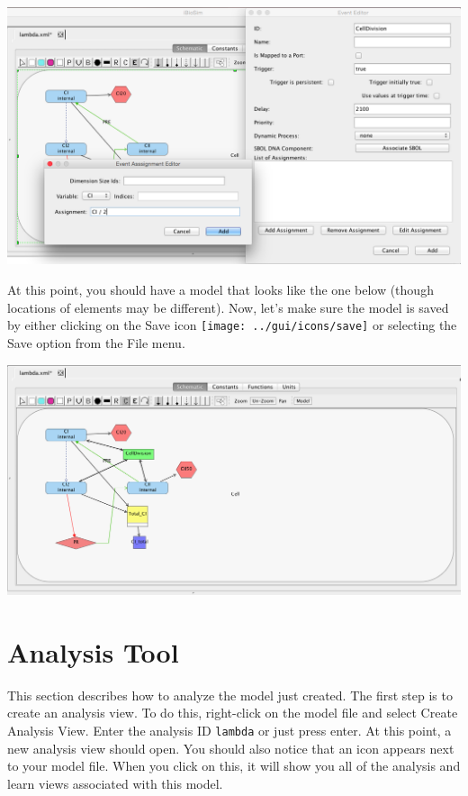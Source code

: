 \documentclass[titlepage,11pt]{article}
\begin{document}
\begin{center}
\includegraphics[width=160mm]{screenshots/event}
\end{center}

At this point, you should have a model that looks like the one below (though locations of elements may be different).  Now, let's make sure the model is saved by either clicking on the Save icon \texttt{[image: ../gui/icons/save]} or selecting the Save option from the File menu.

\begin{center}
\includegraphics[width=160mm]{screenshots/save}
\end{center}

\section{Analysis Tool}

This section describes how to analyze the model just created.  The first step is to create an analysis view.  To do this, right-click on the model file and select Create Analysis View.  Enter the analysis ID {\tt lambda} or just press enter.  At this point, a new analysis view should open.  You should also notice that an icon appears next to your model file.  When you click on this, it will show you all of the analysis and learn views associated with this model.
\end{document}

